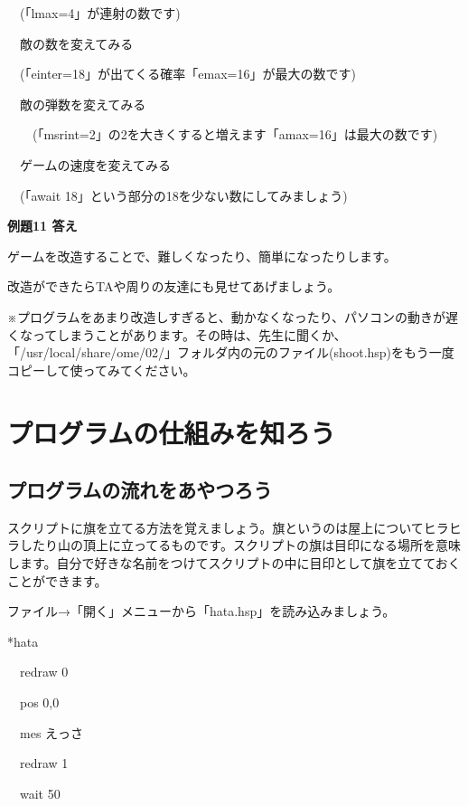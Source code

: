 \documentclass[a4paper,12pt]{jarticle}
\begin{document}
\ \ (「lmax=4」が連射の数です)

\ \ 敵の数を変えてみる

\ \ (「einter=18」が出てくる確率「emax=16」が最大の数です)

\ \ 敵の弾数を変えてみる

\ \ \ \ (「msrint=2」の2を大きくすると増えます「amax=16」は最大の数です)

\ \ ゲームの速度を変えてみる

\ \ (「await
18」という部分の18を少ない数にしてみましょう)

\bigskip
\bigskip

{\bfseries
例題11 答え}


\bigskip

ゲームを改造することで、難しくなったり、簡単になったりします。

改造ができたらTAや周りの友達にも見せてあげましょう。


\bigskip

※プログラムをあまり改造しすぎると、動かなくなったり、パソコンの動きが遅くなってしまうことがあります。その時は、先生に聞くか、「/usr/local/share/ome/02/」フォルダ内の元のファイル(shoot.hsp)をもう一度コピーして使ってみてください。




\clearpage
\section{プログラムの仕組みを知ろう}
\subsection{プログラムの流れをあやつろう}
\bigskip
\bigskip

スクリプトに旗を立てる方法を覚えましょう。旗というのは屋上についてヒラヒラしたり山の頂上に立ってるものです。スクリプトの旗は目印になる場所を意味します。自分で好きな名前をつけてスクリプトの中に目印として旗を立てておくことができます。

ファイル→「開く」メニューから「hata.hsp」を読み込みましょう。


\bigskip

*hata

\ \ redraw 0

\ \ pos 0,0

\ \ mes {\textquotedbl}えっさ{\textquotedbl}

\ \ redraw 1

\ \ wait 50
\end{document}
